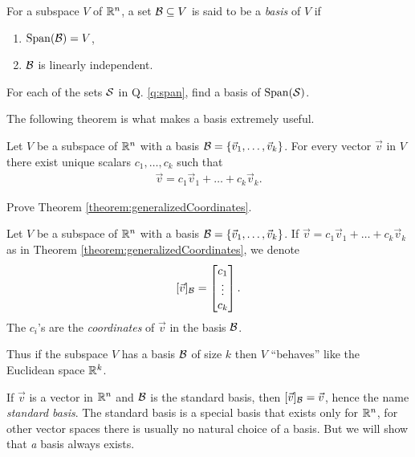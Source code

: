 \begin{definition}
  For a subspace $V$ of $\mathbb{R}^n$, a set $\mathcal{B} \subseteq V$ is said to be a \emph{basis} of $V$ if
  \begin{enumerate}
    \item $\operatorname{Span}(\mathcal{B}) = V$,
    \item ${\mathcal{B}}$ is linearly independent.
  \end{enumerate}
\end{definition}

\begin{qbox}
  For each of the sets $\mathcal{S}$ in Q. \ref{q:span}, find a basis of $\operatorname{Span}(\mathcal{S})$.
\end{qbox}

The following theorem is what makes a basis extremely useful.

\begin{theorem}
  \label{theorem:generalizedCoordinates}
  Let $V$ be a subspace of $\mathbb{R}^n$ with a basis $\mathcal{B} = \left\{\vec{v}_1, \dots, \vec{v}_k\right\}$.
  For every vector $\vec{v}$ in $V$ there exist unique scalars $c_1, \dots, c_k$ such that
  \begin{align*}
    \vec{v} = c_1 \vec{v}_1 + \dots + c_k \vec{v}_k.
  \end{align*}
\end{theorem}

\begin{qbox}
  Prove Theorem \ref{theorem:generalizedCoordinates}.
\end{qbox}

\begin{definition}
  Let $V$ be a subspace of $\mathbb{R}^n$ with a basis $\mathcal{B} = \left\{\vec{v}_1, \dots, \vec{v}_k\right\}$.
  If $\vec{v} = c_1 \vec{v}_1 + \dots + c_k \vec{v}_k$ as in Theorem \ref{theorem:generalizedCoordinates}, we denote
  \begin{align*}
    [\vec{v}]_{\mathcal{B}}
    = \begin{bmatrix}
      c_1 \\
      \vdots \\
      c_k
      \end{bmatrix}.
  \end{align*}
  The $c_i$'s are the \emph{coordinates} of $\vec{v}$ in the basis $\mathcal{B}$.
\end{definition}
Thus if the subspace $V$ has a basis $\mathcal{B}$ of size $k$ then $V$ ``behaves'' like the Euclidean space $\mathbb{R}^k$.
\begin{ex}
  If $\vec{v}$
  is a vector in $\mathbb{R}^n$ and $\mathcal{B}$ is the standard basis, then $[\vec{v}]_{\mathcal{B}} = \vec{v}$, hence the name \emph{standard basis}.
  The standard basis is a special basis that exists only for $\mathbb{R}^n$, for other vector spaces there is usually no natural choice of a basis.
  But we will show that \emph{a} basis always exists.
\end{ex}

